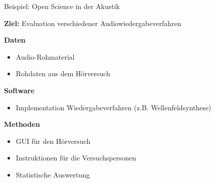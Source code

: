 \documentclass{beamer}
\begin{document}
%
%
%

\begin{frame}{Beispiel: Open Science in der Akustik}

    \textbf{Ziel:} Evaluation verschiedener Audiowiedergabeverfahren

    \vspace{.3cm}

    \textbf{Daten}
    \begin{itemize}
        \item Audio-Rohmaterial
        \item Rohdaten aus dem Hörversuch
    \end{itemize}
    \vspace{.2cm}
    \textbf{Software}
    \begin{itemize}
        \item Implementation Wiedergabeverfahren (z.B. Wellenfeldsynthese)
    \end{itemize}
    \vspace{.2cm}
    \textbf{Methoden}
    \begin{itemize}
        \item GUI für den Hörversuch
        \item Instruktionen für die Versuchspersonen
        \item Statistische Auswertung
    \end{itemize}

\end{frame}
\end{document}
